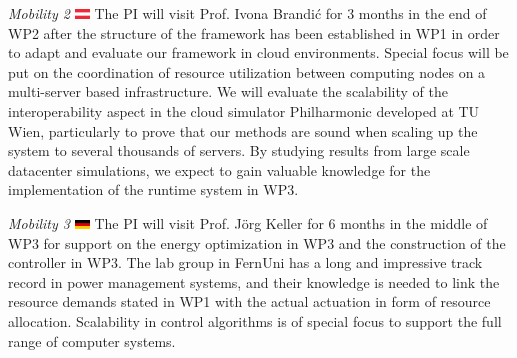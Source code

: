 \documentclass{article}
\begin{document}
\textit{Mobility 2 }\includegraphics[width=0.4cm]{fig/aus.png} The PI will visit Prof. Ivona Brandi\'{c} for 3 months in the end of WP2 after the structure of the framework has been established in WP1 in order to adapt and evaluate our framework in cloud environments. 
Special focus will be put on the coordination of resource utilization between computing nodes on a multi-server based infrastructure.
We will evaluate the scalability of the interoperability aspect in the cloud simulator Philharmonic developed at TU Wien, particularly to prove that our methods are sound when scaling up the system to several thousands of servers.
By studying results from large scale datacenter simulations, we expect to gain valuable knowledge for the implementation of the runtime system in WP3. \smallskip

\textit{Mobility 3 }\includegraphics[width=0.4cm]{fig/ger.png} The PI will visit Prof. J\"{o}rg Keller for 6 months in the middle of WP3 for support on the energy optimization in WP3 and the construction of the controller in WP3.
The lab group in FernUni has a long and impressive track record in power management systems, 
and their knowledge is needed to link the resource demands stated in WP1 with the actual actuation in form of resource allocation.
Scalability in control algorithms is of special focus to support the full range of computer systems.


{\footnotesize
}

\end{document}
